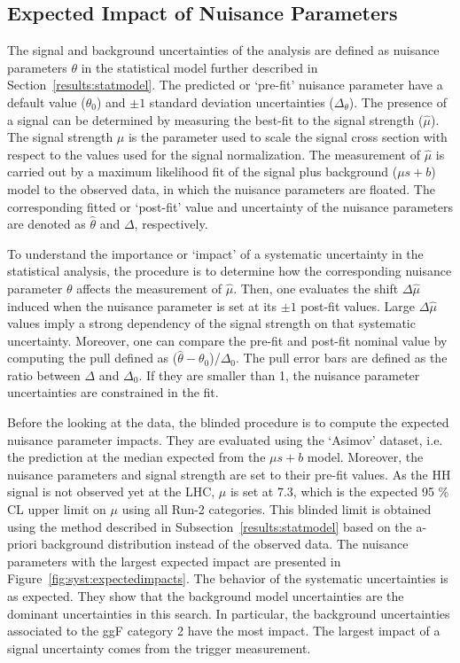 \subsection{Expected Impact of Nuisance Parameters} \label{syst:expectedimpacts}
The signal and background uncertainties of the analysis are defined as nuisance parameters $\theta$ in the statistical model further described in Section~\ref{results:statmodel}. The predicted or `pre-fit' nuisance parameter have a default value ($\theta_{0}$) and $\pm1$ standard deviation uncertainties ($\Delta_{\theta}$). The presence of a signal can be determined by measuring the best-fit to the signal strength ($\hat{\mu}$). The signal strength $\mu$ is the parameter used to scale the signal cross section with respect to the values used for the signal normalization. The measurement of $\hat{\mu}$ is carried out by a maximum likelihood fit of the signal plus background ($\mu s+b$) model to the observed data, in which the nuisance parameters are floated. The corresponding fitted or `post-fit' value and uncertainty of the nuisance parameters are denoted as $\hat{\theta}$ and $\Delta$, respectively. 

To understand the importance or `impact' of a systematic uncertainty in the statistical analysis, the procedure is to determine how the corresponding nuisance parameter $\theta$ affects the measurement of $\hat{\mu}$. Then, one evaluates the shift $\Delta\hat{\mu}$ induced when the nuisance parameter is set at its $\pm1$ post-fit values. Large $\Delta\hat{\mu}$ values imply a strong dependency of the signal strength on that systematic uncertainty. Moreover, one can compare the pre-fit and post-fit nominal value by computing the pull defined as ($\hat{\theta}-\theta_{0}$)/$\Delta_{0}$. The pull error bars are defined as the ratio between $\Delta$ and $\Delta_{0}$. If they are smaller than 1, the nuisance parameter uncertainties are constrained in the fit. 

Before the looking at the data, the blinded procedure is to compute the expected nuisance parameter impacts. They are evaluated using the `Asimov' dataset,  i.e. the prediction at the median expected from the $\mu s+b$ model. Moreover, the nuisance parameters and signal strength are set to their pre-fit values. As the HH signal is not observed yet at the LHC, $\mu$ is set at 7.3, which is the expected 95 \% CL upper limit on $\mu$ using all Run-2 categories. This blinded limit is obtained using the method described in Subsection~\ref{results:statmodel} based on the a-priori background distribution instead of the observed data. The nuisance parameters with the largest expected impact are presented in Figure~\ref{fig:syst:expectedimpacts}. The behavior of the systematic uncertainties is as expected. They show that the background model uncertainties are the dominant uncertainties in this search. In particular, the background uncertainties associated to the ggF category 2 have the most impact. The largest impact of a signal uncertainty comes from the trigger measurement.

